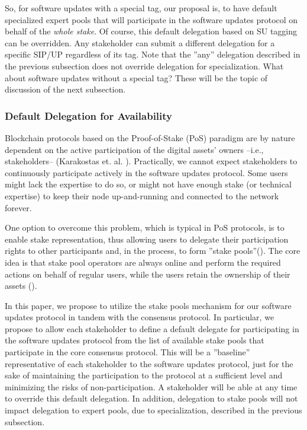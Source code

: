 So, for software updates with a special tag, our proposal is, to have default specialized expert pools that will participate in the software updates protocol on behalf of the \emph{whole stake}. Of course, this default delegation based on SU tagging can be overridden. Any stakeholder can submit a different delegation for a specific SIP/UP regardless of its tag. Note that the ''any'' delegation described in the previous subsection does not override delegation for specialization. What about software updates without a special tag? These will be the topic of discussion of the next subsection.

\subsubsection{Default Delegation for Availability}

Blockchain protocols based on the Proof-of-Stake (PoS) paradigm are by nature dependent on the active participation of the digital assets' owners --i.e., stakeholders-- (Karakostas et. al. \cite{stakepools}). Practically, we cannot expect stakeholders to continuously participate actively in the software updates protocol. Some users might lack the expertise to do so, or might not have enough stake (or technical expertise) to keep their node up-and-running and connected to the network forever.

One option to overcome this problem, which is typical in PoS protocols, is to enable stake representation, thus allowing users to delegate their participation rights to other participants and, in the process, to form
''stake pools''(\cite{stakepools}). The core idea is that stake pool operators are always online and perform
the required actions on behalf of regular users, while the users retain the ownership of their
assets (\cite{stakepools}). 

In this paper, we propose to utilize the stake pools mechanism for our software updates protocol in tandem with the consensus protocol. In particular, we propose to allow each stakeholder to define a default delegate for participating in the software updates protocol from the list of available stake pools that participate in the core consensus protocol. This will be a ''baseline'' representative of each stakeholder to the software updates protocol, just for the sake of maintaining the participation to the protocol at a sufficient level and minimizing the risks of non-participation. A stakeholder will be able at any time to override this default delegation. In addition, delegation to stake pools will not impact delegation to expert pools, due to specialization, described in the previous subsection.

